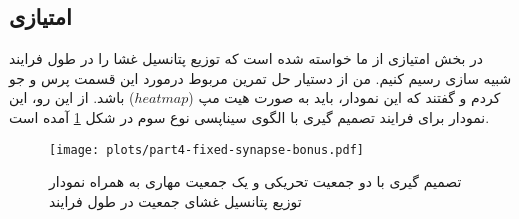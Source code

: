     \subsection{امتیازی}
        در بخش امتیازی از ما خواسته شده است که توزیع پتانسیل غشا را در طول فرایند شبیه سازی رسیم کنیم. من از دستیار حل تمرین مربوط درمورد این قسمت پرس و جو کردم و گفتند که این نمودار، باید به صورت هیت مپ 
        ($heat map$)
        باشد. از این رو، این نمودار برای فرایند تصمیم گیری با الگوی سیناپسی نوع سوم در شکل 
        \ref{fig:part4-fixed-synapse-bonus}
        آمده است.

        \begin{figure}[!ht]
            \centering
            \texttt{[image: plots/part4-fixed-synapse-bonus.pdf]} 
            \caption{تصمیم گیری با دو جمعیت تحریکی و یک جمعیت مهاری به همراه نمودار توزیع پتانسیل غشای جمعیت در طول فرایند}
            \label{fig:part4-fixed-synapse-bonus}
        \end{figure}